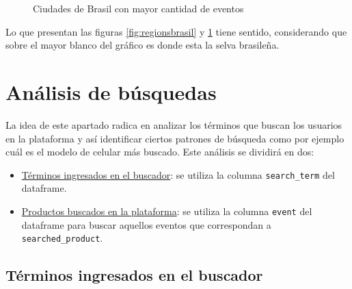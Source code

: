 \documentclass[a4paper]{article}
\begin{document}
\begin{figure}[h!]
	\caption{Ciudades de Brasil con mayor cantidad de eventos}
	\label{fig:citybrasil}
\end{figure}

Lo que presentan las figuras \ref{fig:regionsbrasil} y \ref{fig:citybrasil} tiene sentido, considerando que sobre el mayor blanco del gráfico es donde esta la selva brasileña.

\section{Análisis de búsquedas} \label{busq}

La idea de este apartado radica en analizar los términos que buscan los usuarios en la plataforma y así identificar ciertos patrones de búsqueda como por ejemplo cuál es el modelo de celular más buscado. Este análisis se dividirá en dos:

\begin{itemize}
	\item \underline{Términos ingresados en el buscador}: se utiliza la columna \texttt{search\_term} del dataframe.
	\item \underline{Productos buscados en la plataforma}: se utiliza la columna \texttt{event} del dataframe para buscar aquellos eventos que correspondan a \texttt{searched\_product}.
 \end{itemize}

\subsection{Términos ingresados en el buscador}
\end{document}
